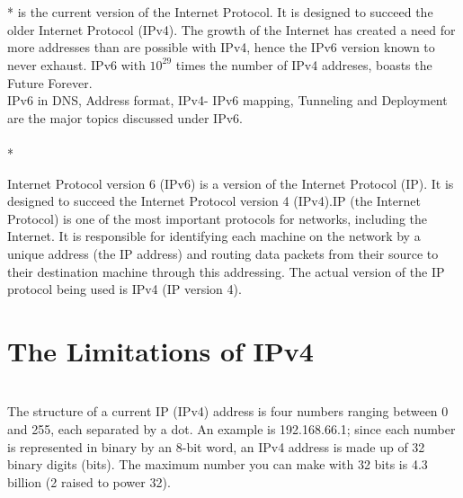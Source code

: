 \documentclass[12pt]{article}
\begin{document}
\makefrontpage

\newpage


\\\\*
\small
\indent {}
is the current version of the Internet Protocol. It is designed to succeed the older Internet Protocol (IPv4). The growth of the Internet has created a need for more addresses than are possible with IPv4, hence the IPv6 version known to never exhaust. IPv6 with $10^{29}$ times the number of IPv4 addreses,  boasts the Future Forever.\\
\indent \indent IPv6 in DNS, Address format, IPv4- IPv6 mapping, Tunneling and Deployment are the major topics discussed under IPv6.
\vspace*{\fill}
\newpage
\setcounter{section}{0}
\\\\*

Internet Protocol version 6 (IPv6) is a version of the Internet Protocol (IP). It is designed to succeed the Internet Protocol version 4 (IPv4).IP (the Internet Protocol) is one of the most important protocols for networks, including the Internet. It is responsible for identifying each machine on the network by a unique address (the IP address) and routing data packets from their source to their destination machine through this addressing. The actual version of the IP protocol being used is IPv4 (IP version 4).\\

\section{The Limitations of IPv4}\\

The structure of a current IP (IPv4) address is four numbers ranging between 0 and 255, each separated by a dot. An example is 192.168.66.1; since each number is represented in binary by an 8-bit word, an IPv4 address is made up of 32 binary digits (bits). The maximum number you can make with 32 bits is 4.3 billion (2 raised to power 32).\\
\end{document}
